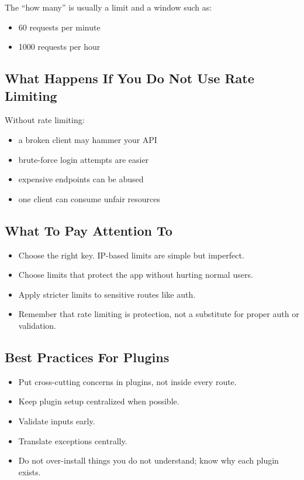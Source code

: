 \documentclass[11pt,a4paper]{article}
\begin{document}
The ``how many'' is usually a limit and a window such as:
\begin{itemize}
    \item 60 requests per minute
    \item 1000 requests per hour
\end{itemize}

\subsection{What Happens If You Do Not Use Rate Limiting}

Without rate limiting:
\begin{itemize}
    \item a broken client may hammer your API
    \item brute-force login attempts are easier
    \item expensive endpoints can be abused
    \item one client can consume unfair resources
\end{itemize}

\subsection{What To Pay Attention To}

\begin{itemize}
    \item Choose the right key. IP-based limits are simple but imperfect.
    \item Choose limits that protect the app without hurting normal users.
    \item Apply stricter limits to sensitive routes like auth.
    \item Remember that rate limiting is protection, not a substitute for proper auth or validation.
\end{itemize}

\subsection{Best Practices For Plugins}

\begin{itemize}
    \item Put cross-cutting concerns in plugins, not inside every route.
    \item Keep plugin setup centralized when possible.
    \item Validate inputs early.
    \item Translate exceptions centrally.
    \item Do not over-install things you do not understand; know why each plugin exists.
\end{itemize}
\end{document}
